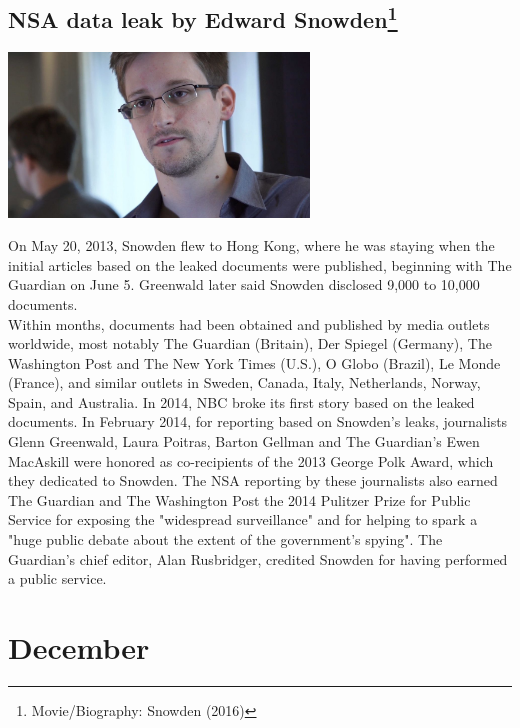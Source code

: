 \documentclass[11pt]{report}
\begin{document}
\subsection{NSA data leak by Edward Snowden\protect\footnote{Movie/Biography: Snowden (2016)}}
\vspace{2mm}\begin{center}\includegraphics[width=8cm]{./img/edwardSnowden.jpg}\end{center}
On May 20, 2013, Snowden flew to Hong Kong, where he was staying when the initial articles based on the leaked documents were published, beginning with The Guardian on June 5. Greenwald later said Snowden disclosed 9,000 to 10,000 documents.\\
\indent Within months, documents had been obtained and published by media outlets worldwide, most notably The Guardian (Britain), Der Spiegel (Germany), The Washington Post and The New York Times (U.S.), O Globo (Brazil), Le Monde (France), and similar outlets in Sweden, Canada, Italy, Netherlands, Norway, Spain, and Australia. In 2014, NBC broke its first story based on the leaked documents. In February 2014, for reporting based on Snowden's leaks, journalists Glenn Greenwald, Laura Poitras, Barton Gellman and The Guardian's Ewen MacAskill were honored as co-recipients of the 2013 George Polk Award, which they dedicated to Snowden. The NSA reporting by these journalists also earned The Guardian and The Washington Post the 2014 Pulitzer Prize for Public Service for exposing the "widespread surveillance" and for helping to spark a "huge public debate about the extent of the government's spying". The Guardian's chief editor, Alan Rusbridger, credited Snowden for having performed a public service.
\section{December}
\end{document}

